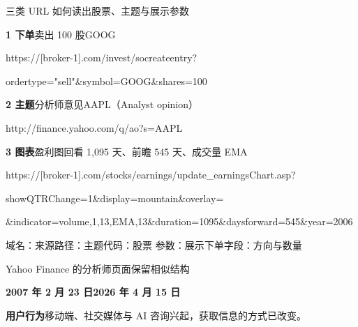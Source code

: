 \newcommand{\udomain}[1]{\textcolor{quiet}{#1}}
\newcommand{\upath}[1]{\textcolor{sampleteal}{#1}}
\newcommand{\ucode}[1]{\textcolor{sampleblue}{#1}}
\newcommand{\uparam}[1]{\textcolor{samplegold}{#1}}
\newcommand{\utrade}[1]{\textcolor{wine}{#1}}
\begin{frame}[label=urls]{三类 URL 如何读出股票、主题与展示参数}
  {\small\textbf{1 下单}\quad\utrade{卖出 100 股}\quad\ucode{GOOG}\par}
  {\fontsize{8}{10}\selectfont\ttfamily
  \udomain{https://[broker-1].com}\upath{/invest/socreateentry?}\par
  \utrade{ordertype="sell"}\ucode{\&symbol=GOOG}\utrade{\&shares=100}\par}
  \smallskip
  {\small\textbf{2 主题}\quad\upath{分析师意见}\quad\ucode{AAPL（Analyst opinion）}\par}
  {\fontsize{8}{10}\selectfont\ttfamily
  \udomain{http://finance.yahoo.com}\upath{/q/ao?}\ucode{s=AAPL}\par}
  \medskip
  {\small\textbf{3 图表}\quad\upath{盈利图}\quad\uparam{回看 1,095 天、前瞻 545 天、成交量 EMA}\par}
  {\fontsize{8}{10}\selectfont\ttfamily
  \udomain{https://[broker-1].com}\upath{/stocks/earnings/update\_earningsChart.asp?}\par
  \uparam{showQTRChange=1\&display=mountain\&overlay=}\par
  \uparam{\&indicator=volume,1,13,EMA,13\&duration=1095\&daysforward=545\&year=2006}\par}
  \medskip
  {\footnotesize\udomain{域名：来源}\quad\upath{路径：主题}\quad\ucode{代码：股票}\quad
   \uparam{参数：展示}\quad\utrade{下单字段：方向与数量}}
\end{frame}

\begin{frame}[label=yahoo]{Yahoo Finance 的分析师页面保留相似结构}
  {\centering
  \par}
  {\small\textbf{2007 年 2 月 23 日}\hfill\textbf{2026 年 4 月 15 日}\par}\smallskip
       {\small\textbf{用户行为}\quad 移动端、社交媒体与 AI 咨询兴起，获取信息的方式已改变。}
\end{frame}

